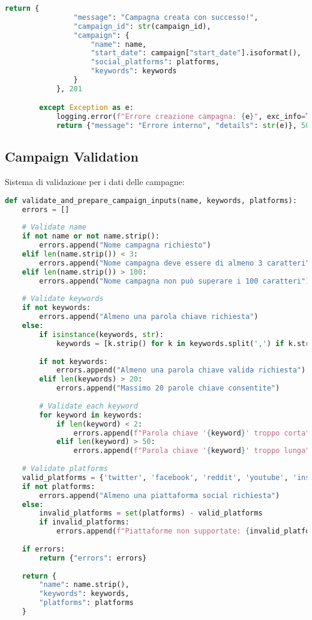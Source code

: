\documentclass[12pt,a4paper]{report}
\begin{document}
\begin{lstlisting}[language=Python, caption=Campaign Service - Create Campaign]
            return {
                "message": "Campagna creata con successo!",
                "campaign_id": str(campaign_id),
                "campaign": {
                    "name": name,
                    "start_date": campaign["start_date"].isoformat(),
                    "social_platforms": platforms,
                    "keywords": keywords
                }
            }, 201

        except Exception as e:
            logging.error(f"Errore creazione campagna: {e}", exc_info=True)
            return {"message": "Errore interno", "details": str(e)}, 500
\end{lstlisting}

\subsection{Campaign Validation}

Sistema di validazione per i dati delle campagne:

\begin{lstlisting}[language=Python, caption=Campaign Validation]
def validate_and_prepare_campaign_inputs(name, keywords, platforms):
    errors = []
    
    # Validate name
    if not name or not name.strip():
        errors.append("Nome campagna richiesto")
    elif len(name.strip()) < 3:
        errors.append("Nome campagna deve essere di almeno 3 caratteri")
    elif len(name.strip()) > 100:
        errors.append("Nome campagna non può superare i 100 caratteri")
    
    # Validate keywords
    if not keywords:
        errors.append("Almeno una parola chiave richiesta")
    else:
        if isinstance(keywords, str):
            keywords = [k.strip() for k in keywords.split(',') if k.strip()]
        
        if not keywords:
            errors.append("Almeno una parola chiave valida richiesta")
        elif len(keywords) > 20:
            errors.append("Massimo 20 parole chiave consentite")
        
        # Validate each keyword
        for keyword in keywords:
            if len(keyword) < 2:
                errors.append(f"Parola chiave '{keyword}' troppo corta")
            elif len(keyword) > 50:
                errors.append(f"Parola chiave '{keyword}' troppo lunga")
    
    # Validate platforms
    valid_platforms = {'twitter', 'facebook', 'reddit', 'youtube', 'instagram'}
    if not platforms:
        errors.append("Almeno una piattaforma social richiesta")
    else:
        invalid_platforms = set(platforms) - valid_platforms
        if invalid_platforms:
            errors.append(f"Piattaforme non supportate: {invalid_platforms}")
    
    if errors:
        return {"errors": errors}
    
    return {
        "name": name.strip(),
        "keywords": keywords,
        "platforms": platforms
    }
\end{lstlisting}
\end{document}
